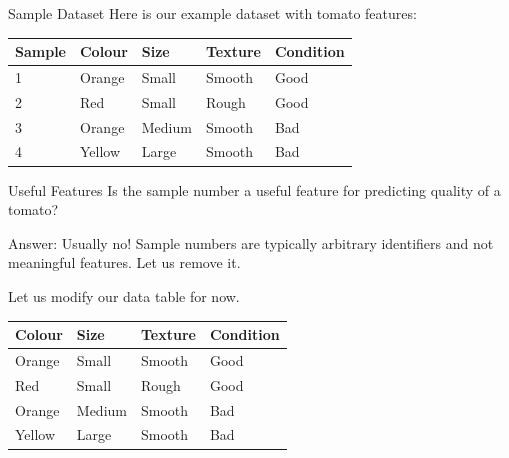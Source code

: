 \documentclass[usenames,dvipsnames]{beamer}
\begin{document}
\begin{frame}{Sample Dataset}
Here is our example dataset with tomato features: 

\begin{table}[]
	\begin{tabular}{|l|l|l|l||l|}
		\hline 
		\textbf{Sample} & \textbf{Colour} & \textbf{Size} & \textbf{Texture} & \textbf{Condition} \\ \hline 
		1      & Orange & Small & Smooth  & Good      \\
		2      & Red    & Small  & Rough  & Good \\
		3      & Orange & Medium & Smooth & Bad \\
		4      & Yellow & Large  & Smooth & Bad \\ \hline          
	\end{tabular}
\end{table}
\end{frame}

\begin{frame}{Useful Features}
Is the sample number a useful feature for predicting quality of a tomato?

\pause Answer: Usually no! Sample numbers are typically arbitrary identifiers and not meaningful features. Let us remove it.

\pause Let us modify our data table for now.

\begin{table}[]
	\begin{tabular}{|l|l|l||l|}
		\hline 
		\textbf{Colour} & \textbf{Size} & \textbf{Texture} & \textbf{Condition} \\ \hline 
		Orange & Small & Smooth  & Good      \\
		Red    & Small  & Rough  & Good \\
		Orange & Medium & Smooth & Bad \\
		Yellow & Large  & Smooth & Bad \\ \hline 

	\end{tabular}
\end{table}
\end{frame}
\end{document}
